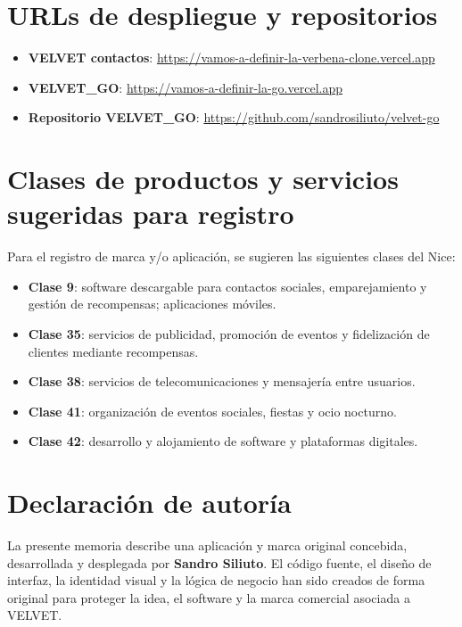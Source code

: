 \documentclass[11pt,a4paper]{article}
\begin{document}
\section{URLs de despliegue y repositorios}

\begin{itemize}[leftmargin=*]
  \item \textbf{VELVET contactos}: \url{https://vamos-a-definir-la-verbena-clone.vercel.app}
  \item \textbf{VELVET\_GO}: \url{https://vamos-a-definir-la-go.vercel.app}
  \item \textbf{Repositorio VELVET\_GO}: \url{https://github.com/sandrosiliuto/velvet-go}
\end{itemize}

\section{Clases de productos y servicios sugeridas para registro}

Para el registro de marca y/o aplicación, se sugieren las siguientes clases del Nice:

\begin{itemize}[leftmargin=*]
  \item \textbf{Clase 9}: software descargable para contactos sociales, emparejamiento y gestión de recompensas; aplicaciones móviles.
  \item \textbf{Clase 35}: servicios de publicidad, promoción de eventos y fidelización de clientes mediante recompensas.
  \item \textbf{Clase 38}: servicios de telecomunicaciones y mensajería entre usuarios.
  \item \textbf{Clase 41}: organización de eventos sociales, fiestas y ocio nocturno.
  \item \textbf{Clase 42}: desarrollo y alojamiento de software y plataformas digitales.
\end{itemize}

\section{Declaración de autoría}

La presente memoria describe una aplicación y marca original concebida, desarrollada y desplegada por \textbf{Sandro Siliuto}. El código fuente, el diseño de interfaz, la identidad visual y la lógica de negocio han sido creados de forma original para proteger la idea, el software y la marca comercial asociada a VELVET.
\end{document}
